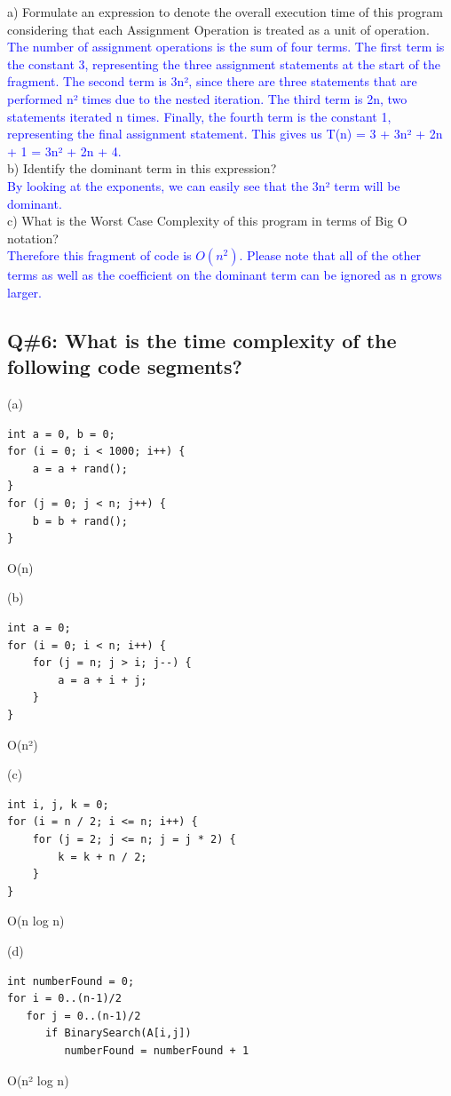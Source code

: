 a) Formulate an expression to denote the overall execution time of this program considering that each Assignment Operation is treated as a unit of operation. \\ 
\textcolor{blue}{
The number  of  assignment  operations  is  the  sum of  four  terms.  The first  term is  the  constant  3, representing the three assignment statements at the start of the fragment. The second term is 3n², since there are three statements that are performed n² times due to the nested iteration. The third term is 2n, two  statements  iterated  n times.  Finally,  the  fourth  term is  the  constant  1,  representing  the  final assignment statement. This gives us T(n) = 3 + 3n² + 2n + 1 = 3n² + 2n + 4.
}\\
b) Identify the dominant term in this expression? \\ 
\textcolor{blue}{
By looking at the exponents, we can easily see that the 3n² term will be dominant.
}\\
c) What is the Worst Case Complexity of this program in terms of Big O notation?  \\
\textcolor{blue}{
Therefore this fragment of code is \(O(n^2)\). Please note that all of the other terms as well as the coefficient on the dominant term can be ignored as n grows larger.
}
\subsection*{Q\#6: What is the time complexity of the following code segments?}

(a)
\begin{verbatim}
int a = 0, b = 0;
for (i = 0; i < 1000; i++) {
    a = a + rand();
}
for (j = 0; j < n; j++) {
    b = b + rand();
}
\end{verbatim}
O(n)

(b)
\begin{verbatim}
int a = 0;
for (i = 0; i < n; i++) {
    for (j = n; j > i; j--) {
        a = a + i + j;
    }
}
\end{verbatim}
O(n²)

(c)
\begin{verbatim}
int i, j, k = 0;
for (i = n / 2; i <= n; i++) {
    for (j = 2; j <= n; j = j * 2) {
        k = k + n / 2;
    }
}
\end{verbatim}
O(n log n)

(d)
\begin{verbatim}
int numberFound = 0;
for i = 0..(n-1)/2
   for j = 0..(n-1)/2
      if BinarySearch(A[i,j])
         numberFound = numberFound + 1
\end{verbatim}
O(n² log n)

